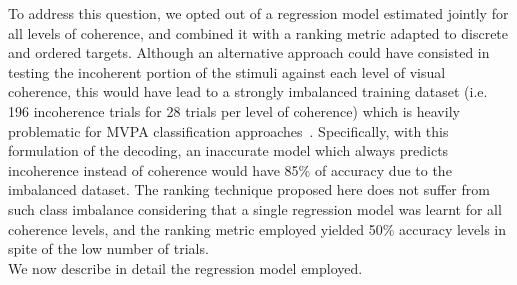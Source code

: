To address this question, we opted out of a regression model estimated jointly for all levels of coherence, and combined it with a ranking metric adapted to discrete and ordered targets. Although an alternative approach could have consisted in testing the incoherent portion of the stimuli against each level of visual coherence, this would have lead to a strongly imbalanced training dataset (i.e. 196 incoherence trials for 28 trials per level of coherence) which is heavily problematic for MVPA classification approaches~\cite{He:2009:LID:1591901.1592322}. Specifically, with this formulation of the decoding, an inaccurate model which always predicts incoherence instead of coherence would have 85\% of accuracy due to the imbalanced dataset. The ranking technique proposed here does not suffer from such class imbalance considering that a single regression model was learnt for all coherence levels, and the ranking metric employed yielded 50\% accuracy levels in spite of the low number of trials.\\

We now describe in detail the regression model employed.

